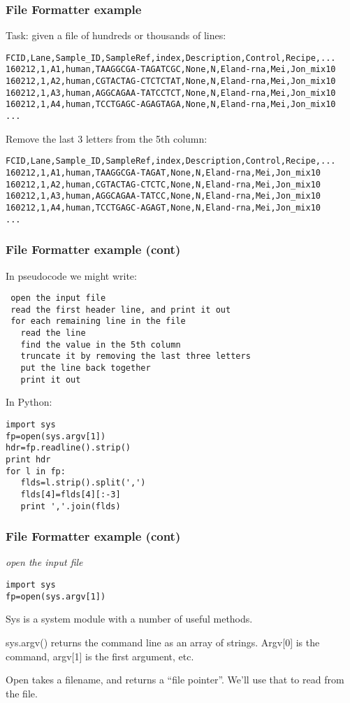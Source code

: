 \documentclass[10pt]{beamer}
\newcommand\smallfont{\fontsize{8pt}{7.2}\selectfont}
\begin{document}
\begin{frame}[fragile]
\frametitle{File Formatter example}

Task: given a file of hundreds or thousands of lines:

\begin{verbatim}
FCID,Lane,Sample_ID,SampleRef,index,Description,Control,Recipe,...
160212,1,A1,human,TAAGGCGA-TAGATCGC,None,N,Eland-rna,Mei,Jon_mix10
160212,1,A2,human,CGTACTAG-CTCTCTAT,None,N,Eland-rna,Mei,Jon_mix10
160212,1,A3,human,AGGCAGAA-TATCCTCT,None,N,Eland-rna,Mei,Jon_mix10
160212,1,A4,human,TCCTGAGC-AGAGTAGA,None,N,Eland-rna,Mei,Jon_mix10
...
\end{verbatim}

Remove the last 3 letters from the 5th column:

\begin{verbatim}
FCID,Lane,Sample_ID,SampleRef,index,Description,Control,Recipe,...
160212,1,A1,human,TAAGGCGA-TAGAT,None,N,Eland-rna,Mei,Jon_mix10
160212,1,A2,human,CGTACTAG-CTCTC,None,N,Eland-rna,Mei,Jon_mix10
160212,1,A3,human,AGGCAGAA-TATCC,None,N,Eland-rna,Mei,Jon_mix10
160212,1,A4,human,TCCTGAGC-AGAGT,None,N,Eland-rna,Mei,Jon_mix10
...
\end{verbatim}
\end{frame}

\begin{frame}[fragile]
\frametitle{File Formatter example (cont)}
\smallfont
In pseudocode we might write:
\begin{verbatim}
 open the input file
 read the first header line, and print it out
 for each remaining line in the file
   read the line
   find the value in the 5th column
   truncate it by removing the last three letters
   put the line back together
   print it out
\end{verbatim}
In Python:
\begin{verbatim}
import sys
fp=open(sys.argv[1])
hdr=fp.readline().strip()
print hdr
for l in fp:
   flds=l.strip().split(',')
   flds[4]=flds[4][:-3]
   print ','.join(flds)
\end{verbatim}
\end{frame}

\begin{frame}[fragile]
\frametitle{File Formatter example (cont)}

\textit{open the input file}

\begin{verbatim}
import sys
fp=open(sys.argv[1])
\end{verbatim}

Sys is a system module with a number of useful methods.  

sys.argv() returns the command line as an array of strings.  Argv[0] is the command, argv[1] is the first
argument, etc.

Open takes a filename, and returns a ``file pointer''.  We'll use that
to read from the file.

\end{frame}
\end{document}
